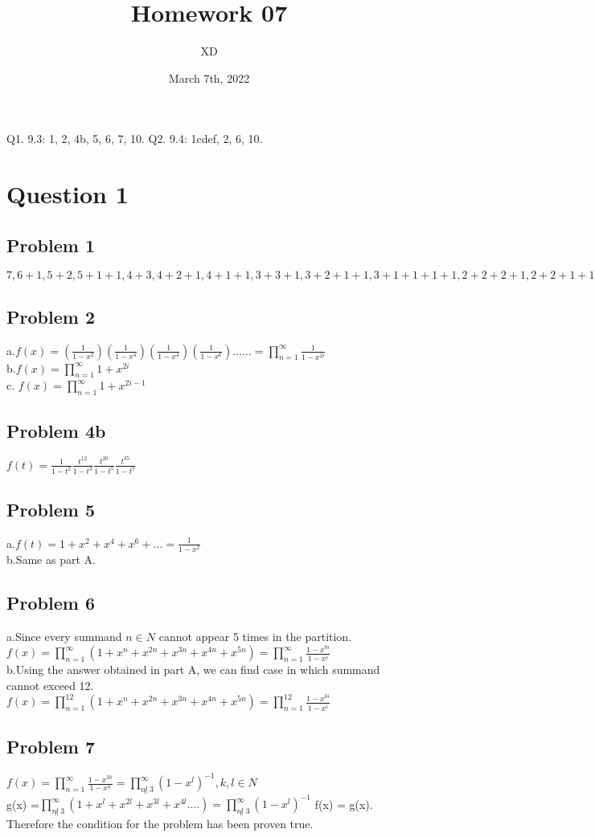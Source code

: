 \documentclass[15pt]{article}
\title{Homework 07}
\author{XD}
\date{March 7th,  2022}
\begin{document}
\maketitle
\newpage
\justify
Q1.
9.3: 1, 2, 4b, 5, 6, 7, 10.
Q2.
9.4: 1cdef, 2, 6, 10.
\section*{Question 1}
\subsection*{Problem 1}
$7, 6 + 1, 5 + 2, 5 + 1 + 1, 4 + 3, 4 + 2 + 1, 4 + 1 + 1, 3 + 3 + 1, 3 + 2 + 1 +1, 3 + 1 + 1 + 1 + 1,2 + 2 + 2 + 1, 2 + 2 + 1 + 1 + 1, 2 + 1 +1 +1 +1 +1, 1 + 1 +1 +1+1+1+1$
\subsection*{Problem 2}
a.$f(x)=(\frac{1}{1-x^2})(\frac{1}{1-x^4})(\frac{1}{1-x^4})(\frac{1}{1-x^6})......=\prod_{n=1}^{\infty}\frac{1}{1-x^{2i}}$\\
b.$f(x) = \prod_{n=1}^{\infty}{1+x^{2i}}$\\
c. $f(x) = \prod_{n=1}^{\infty}{1+x^{2i-1}}$
\subsection*{Problem 4b}
$f(t)=\frac{1}{1-t^2} \frac{t^{12}}{1-t^3}\frac{t^{20}}{1-t^5} \frac{t^{35}}{1-t^7}$
\subsection*{Problem 5}
a.$f(t)=1+x^2 +x^4 + x^6 +...= \frac{1}{1 - x^2} $ \\
b.Same as part A.
\subsection*{Problem 6}
a.Since every summand $n \in N$ cannot appear 5 times in the partition.  $f(x)= \prod_{n=1}^{\infty}(1+x^n + x^{2n} + x^{3n} + x^{4n} + x^{5n}) = \prod_{n=1}^{\infty}\frac{1-x^{6i}}{1-x^i}$\\
b.Using the answer obtained in part A, we can find case in which summand cannot exceed 12. $f(x)= \prod_{n=1}^{12}(1+x^n + x^{2n} + x^{3n} + x^{4n} + x^{5n})=\prod_{n=1}^{12}\frac{1-x^{6i}}{1-x^i}$
\subsection*{Problem 7}
$f(x)= \prod_{n=1}^{\infty}\frac{1-x^{3k}}{1-x^k}= \prod_{n\not| \:3}^{\infty}(1-x^l)^{-1}, k,l \in N$\\
g(x) =$\prod_{n\not| \:3}^{\infty}(1+x^l + x^{2l} + x^{3l} + x^{4l}....)= \prod_{n\not| \:3}^{\infty}(1-x^l)^{-1}$
f(x) = g(x). \\Therefore the condition for the problem has been proven true. 
\end{document}
